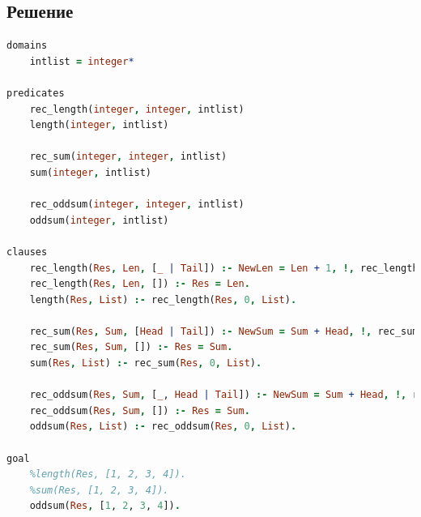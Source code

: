 \documentclass[12pt]{report}
\begin{document}
\subsection*{Решение}
\begin{lstlisting}[language=prolog]
domains
	intlist = integer*

predicates
	rec_length(integer, integer, intlist)
	length(integer, intlist)

	rec_sum(integer, integer, intlist)
	sum(integer, intlist)

	rec_oddsum(integer, integer, intlist)
	oddsum(integer, intlist)

clauses
	rec_length(Res, Len, [_ | Tail]) :- NewLen = Len + 1, !, rec_length(Res, NewLen, Tail).
	rec_length(Res, Len, []) :- Res = Len.
	length(Res, List) :- rec_length(Res, 0, List).

	rec_sum(Res, Sum, [Head | Tail]) :- NewSum = Sum + Head, !, rec_sum(Res, NewSum, Tail).
	rec_sum(Res, Sum, []) :- Res = Sum.
	sum(Res, List) :- rec_sum(Res, 0, List).

	rec_oddsum(Res, Sum, [_, Head | Tail]) :- NewSum = Sum + Head, !, rec_oddsum(Res, NewSum, Tail).
	rec_oddsum(Res, Sum, []) :- Res = Sum.
	oddsum(Res, List) :- rec_oddsum(Res, 0, List).

goal
	%length(Res, [1, 2, 3, 4]).
	%sum(Res, [1, 2, 3, 4]).
	oddsum(Res, [1, 2, 3, 4]).
\end{lstlisting}


	
\end{document}
